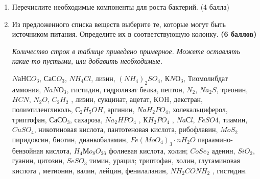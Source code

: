 
\begin{enumerate}
    \item Перечислите необходимые компоненты для роста бактерий. 
    (4 балла)
    \item Из предложенного списка веществ выберите те, которые могут быть источником питания. Определите их в соответствующую колонку. \textbf{(6 баллов)} 
    
    \textit{Количество строк в таблице приведено примерное. Можете оставлять какие-то пустыми, или добавить необходимые.}
    
    $NаНСO_3$, $СаСO_3$, $NH_4Cl$, лизин, $(NH_4)
    _2SO_4$, $КNО_3$, Тиомолибдат аммония, $NaNО_3$, гистидин, гидролизат белка, пептон, $N_2$, $Na_2S$, треонин, $HCN$, $N_2O$, $C_2H_2$ , лизин, сукцинат, ацетат, КOH, декстран, полиэтиленгликоль, $С_2H_5OH$, аргинин, $NaH_2PO_4$, холекальциферол, триптофан, $СаСО_3$, сахароза, $Na_2HPO_4$ , $КH_2PO_4$ , $NaСl$, $FeSO4$, тиамин,$CuSO_4$, никотиновая кислота, пантотеновая кислота, рибофлавин, $MoS_2$ пиридоксин, биотин, дианкобаламин, $Fe(MoO_4)_3 \cdot nH_2O$  параамино-бензойная кислота, $H_4Мo_8O_{26}$ фолиевая кислота, холин;  $CoSe_2$ аденин, $SiO_2$, гуанин, цитозин, $SeSO_3$ тимин, урацил; триптофан, холин, глутаминовая кислота , метионин, валин, лейцин, фенилаланин, $NH_2CONH_2$ , гистидин.


\end{enumerate}
